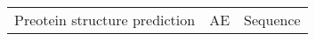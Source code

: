 \begin{center}
\begin{tabular}{l c c}
    Preotein structure prediction & AE & Sequence
\end{tabular}
\end{center}